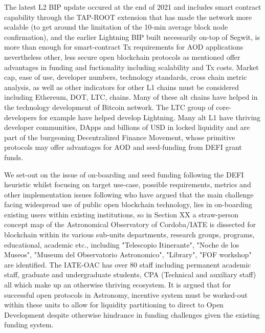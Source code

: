 \documentclass[final,5p,times,twocolumn,authoryear]{elsarticle}
\begin{document}
The latest L2 BIP update occured at the end of 2021 and includes smart contract capability through the TAP-ROOT extension that has made the network more scalable (to get around the limitation of the 10-min average block node confirmation), and the earlier Lightning BIP built necessarily on-top of Segwit, is more than enough for smart-contract Tx requirements for AOD applications nevertheless other, less secure open blockchain protocols as mentioned  offer advantages in funding and fuctionality including scalability and Tx costs. Market cap, ease of use, developer numbers, technology standards, cross chain metric analysis, as well as other indicators for other L1 chains must be considered including Ethereum, DOT, LTC, chains. Many of these alt chains have helped in the technology development of Bitcoin network. The LTC group of core-developers for example have helped develop Lightning. Many alt L1 have thriving developer communities, DApps and billions of USD in locked liquidity and are part of the burgeoning Decentralized Finance Movement, whose primitive protocols may offer advantages for AOD and seed-funding from DEFI grant funds. 

We set-out on the issue of on-boarding and seed funding following the DEFI heuristic whilst focusing on target use-case, possible requirements, metrics and other implementation issues following \cite{20d30b4efb014b21b7ab27f5218692ab} who have argued that the main challenge facing widespread use of public open blockchain technology, lies in on-boarding existing users within existing institutions, so in Section XX a straw-person concept map of the Astronomical Observatory of Cordoba/IATE is dissected for blockchain within its various sub-units departments, research groups, programs, educational, academic etc., including "Telescopio Itinerante", "Noche de los Museos", "Museum del Observatorio Astronomico", "Library", "FOF workshop" are identified. The IATE-OAC has over 80 staff including permanent academic staff, graduate and undergraduate students,  CPA (Technical and auxiliary staff) all which make up an otherwise thriving ecosystem. It is argued that for successful open protocols in Astronomy, incentive system must be worked-out within these units to allow for liquidity partitioning to direct to Open Development despite otherwise hindrance in funding challenges given the existing funding system.
\end{document}
